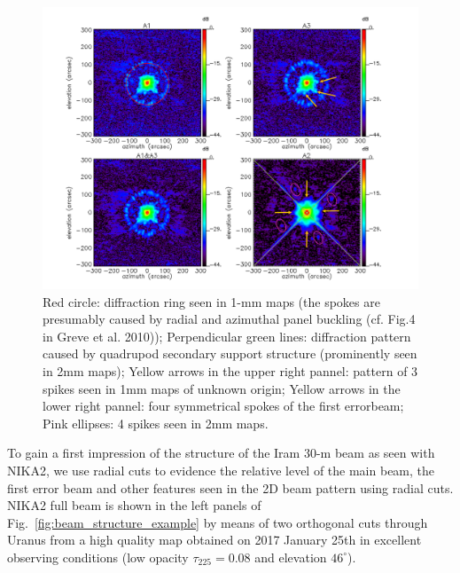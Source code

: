 \begin{figure}[ht!]
\begin{center}
  \includegraphics[clip, angle=0, scale=0.4]{Figures/Beams_features.pdf}
\caption[Noticeable features of NIKA2 beam pattern.]{ Red circle: diffraction ring seen in 1-mm maps (the spokes are presumably caused by radial and azimuthal panel buckling (cf. Fig.4 in Greve et al. 2010)); Perpendicular green lines: diffraction pattern caused by quadrupod secondary support structure (prominently seen in 2mm maps); Yellow arrows in the upper right pannel: pattern of 3 spikes seen in 1mm maps of unknown origin; Yellow arrows in the lower right pannel: four symmetrical spokes of the first errorbeam; Pink ellipses: 4 spikes seen in 2mm maps.}
\label{fig:features}
\end{center}
\end{figure}


To gain a first impression of the structure of the Iram 30-m beam as
seen with NIKA2, we use radial cuts to evidence the relative level of
the main beam, the first error beam and other features seen in the 2D
beam pattern using radial cuts. NIKA2 full beam is shown in the left
panels of Fig.~\ref{fig:beam_structure_example} by means of two
orthogonal cuts through Uranus from a high quality map obtained on
2017 January 25th in excellent observing conditions
(low opacity $\tau_{225}=0.08$ and elevation $46^{\circ}$).


